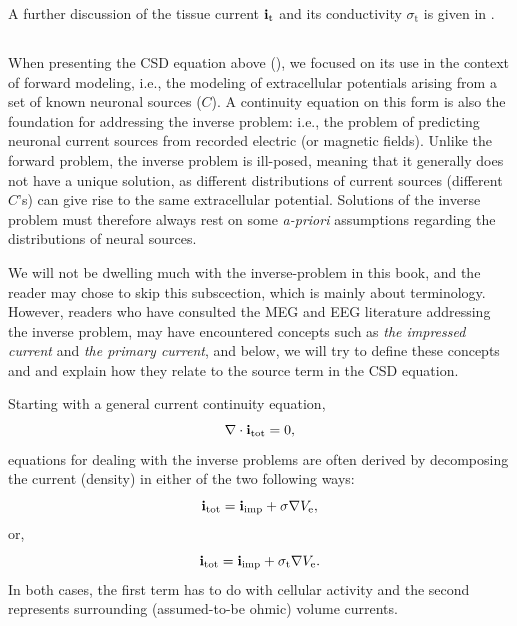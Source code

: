 A further discussion of the tissue current ${\bf i}_\text{t}$ and its conductivity $\sigma_\text{t}$
is given in .


\subsection{}
\label{sec:VC:C4}
When presenting the CSD equation above (), 
we focused on its use in the context of forward modeling, 
i.e., the modeling of extracellular potentials arising from a set of known neuronal sources ($C$). 
A continuity equation on this form is also the foundation 
for addressing the inverse problem: i.e., the problem of predicting 
neuronal current sources from recorded electric (or magnetic fields).
Unlike the forward problem, the inverse problem is ill-posed, 
meaning that it generally does not have a unique solution,
as different distributions of current sources (different $C$'s)
can give rise to the same extracellular potential. 
Solutions of the inverse problem must therefore always rest on some
\textit{a-priori} assumptions regarding the distributions of neural sources. 

We will not be dwelling much with the inverse-problem in this book, 
and the reader may chose to skip this subscection, which is mainly about terminology. 
However, readers who have consulted the MEG and EEG literature
addressing the inverse problem, may have encountered concepts such
as \textit{the impressed current} and 
\textit{the primary current}, 
and below, we will try to define these concepts and
and explain how they relate to the source term in the CSD equation.

Starting with a general current continuity equation, 
\begin{equation} 
{\bf \nabla} \cdot {\bf i_\text{tot}} = 0, 
\label{eq:VC:inverse0}
\end{equation}
equations for dealing with the inverse problems are often derived by decomposing the current (density)
in either of the two following ways: 
\begin{equation}
{\bf i_\text{tot}} =  {\bf i}_\mathrm{imp} + \sigma {\bf \nabla} V_\mathrm{e}, 
\label{eq:VC:inverse1}
\end{equation}
or, 
\begin{equation}
{\bf i_\text{tot}} = {\bf i}_\mathrm{imp} + \sigma_\text{t} {\bf \nabla} V_\mathrm{e}.
\label{eq:VC:inverse2}
\end{equation}
In both cases, the first term has to do with cellular activity
and the second represents surrounding (assumed-to-be ohmic) volume currents.

